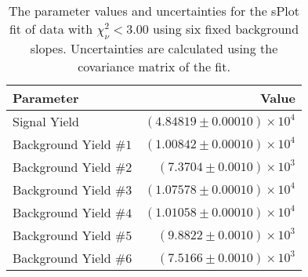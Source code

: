 
\begin{table}[h]
    \begin{center}
        \begin{tabular}{lr}\toprule
            Parameter & Value \\\midrule
            Signal Yield & $(4.84819 \pm 0.00010) \times 10^{4}$ \\
            Background Yield $\#1$ & $(1.00842 \pm 0.00010) \times 10^{4}$ \\
            Background Yield $\#2$ & $(7.3704 \pm 0.0010) \times 10^{3}$ \\
            Background Yield $\#3$ & $(1.07578 \pm 0.00010) \times 10^{4}$ \\
            Background Yield $\#4$ & $(1.01058 \pm 0.00010) \times 10^{4}$ \\
            Background Yield $\#5$ & $(9.8822 \pm 0.0010) \times 10^{3}$ \\
            Background Yield $\#6$ & $(7.5166 \pm 0.0010) \times 10^{3}$ \\\bottomrule
        \end{tabular}
        \caption{The parameter values and uncertainties for the sPlot fit of data with $\chi^2_\nu < 3.00$ using six fixed background slopes. Uncertainties are calculated using the covariance matrix of the fit.}
    \end{center}
\end{table}
